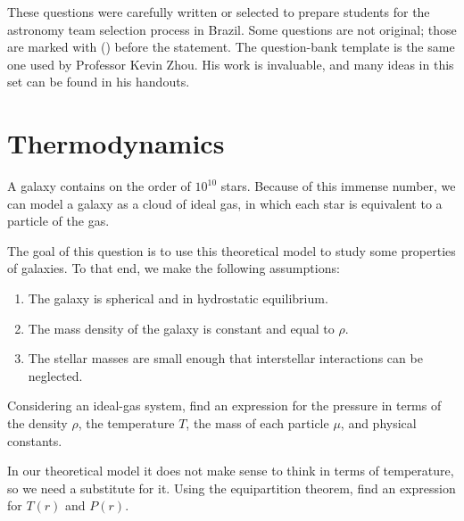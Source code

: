 \documentclass[11pt]{article}
\begin{document}

These questions were carefully written or selected to prepare students for the astronomy team selection process in Brazil. Some questions are not original; those are marked with () before the statement. The question-bank template is the same one used by Professor Kevin Zhou. His work is invaluable, and many ideas in this set can be found in his handouts.





\section{Thermodynamics}
\begin{pproblem}
    A galaxy contains on the order of \(10^{10}\) stars. Because of this immense number, we can model a galaxy as a cloud of ideal gas, in which each star is equivalent to a particle of the gas.
    
    The goal of this question is to use this theoretical model to study some properties of galaxies. To that end, we make the following assumptions:

    \begin{enumerate}[label=\roman*)]
        \item The galaxy is spherical and in hydrostatic equilibrium.
        \item The mass density of the galaxy is constant and equal to \(\rho\).
        \item The stellar masses are small enough that interstellar interactions can be neglected.
    \end{enumerate}
    
    \begin{alternativas}
        \item Considering an ideal-gas system, find an expression for the pressure in terms of the density \(\rho\), the temperature \(T\), the mass of each particle \(\mu\), and physical constants.
        
        \item In our theoretical model it does not make sense to think in terms of temperature, so we need a substitute for it. Using the equipartition theorem, find an expression for \(T(r)\) and \(P(r)\).
    \end{alternativas}

\end{pproblem}
\end{document}

